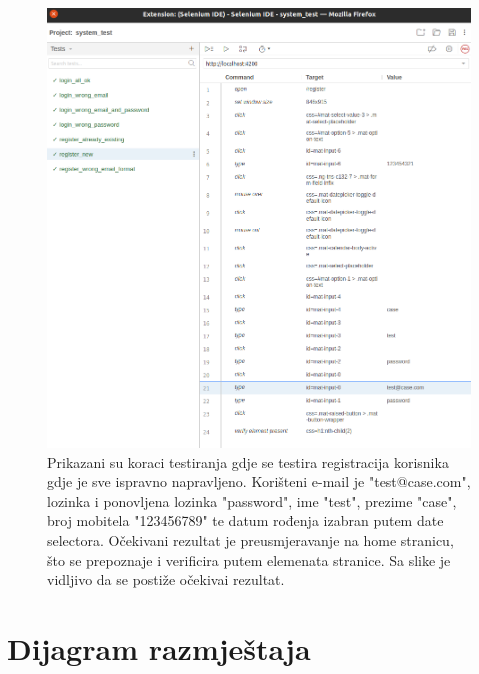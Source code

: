            \begin{figure}[H]
                \includegraphics[width=\textwidth]{slike/tests_system/register_new.png} %
                \caption{Prikazani su koraci testiranja gdje se testira registracija korisnika gdje je sve ispravno napravljeno. Korišteni e-mail je "test@case.com", lozinka i ponovljena lozinka "password", ime "test", prezime "case", broj mobitela "123456789" te datum rođenja izabran putem date selectora. Očekivani rezultat je preusmjeravanje na home stranicu, što se prepoznaje i verificira putem elemenata stranice. Sa slike je vidljivo da se postiže očekivai rezultat.}
                \label{fig:struktura} %
            \end{figure}
            
            \eject
		
		\section{Dijagram razmještaja}
			
			
			 
